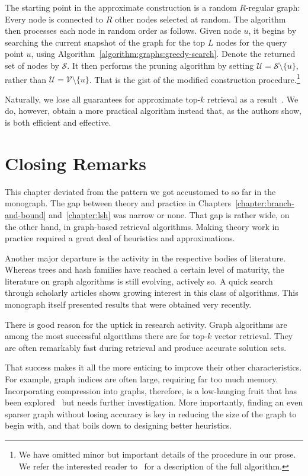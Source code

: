 The starting point in the approximate construction is a random $R$-regular graph:
Every node is connected to $R$ other nodes selected at random.
The algorithm then processes each node in random order as follows.
Given node $u$, it begins by searching the current snapshot of the graph for the top $L$
nodes for the query point $u$, using Algorithm~\ref{algorithm:graphs:greedy-search}.
Denote the returned set of nodes by $\mathcal{S}$. It then performs the
pruning algorithm by setting $\mathcal{U} = \mathcal{S} \setminus \{ u \}$, rather
than $\mathcal{U} = \mathcal{V} \setminus \{ u \}$.
That is the gist of the modified construction
procedure.\footnote{We have omitted minor but important details of the procedure
in our prose. We refer the interested reader to~\citep{diskann} for a description of
the full algorithm.}

Naturally, we lose all guarantees for approximate top-$k$ retrieval
as a result~\citep{indyk2023worstcase}. We do, however, obtain a more
practical algorithm instead that, as the authors show,
is both efficient and effective.

\section{Closing Remarks}

This chapter deviated from the pattern we got accustomed to so far in the monograph.
The gap between theory and practice in Chapters~\ref{chapter:branch-and-bound}
and~\ref{chapter:lsh} was narrow or none. That gap is rather wide, on the other hand,
in graph-based retrieval algorithms. Making theory work in practice required a great deal
of heuristics and approximations.

Another major departure is the activity in the respective bodies of literature.
Whereas trees and hash families have reached a certain level of maturity,
the literature on graph algorithms is still evolving, actively so.
A quick search through scholarly articles shows growing interest in this class
of algorithms. This monograph itself presented results that were obtained very recently.

There is good reason for the uptick in research activity.
Graph algorithms are among the most successful algorithms there are
for top-$k$ vector retrieval. They are often remarkably fast during retrieval
and produce accurate solution sets.

That success makes it all the more enticing to improve their other characteristics.
For example, graph indices are often large, requiring far too much memory.
Incorporating compression into graphs, therefore, is a low-hanging fruit
that has been explored~\citep{singh2021freshdiskann} but needs further investigation.
More importantly, finding an even sparser graph without losing accuracy
is key in reducing the size of the graph to begin with, and that boils down
to designing better heuristics.


